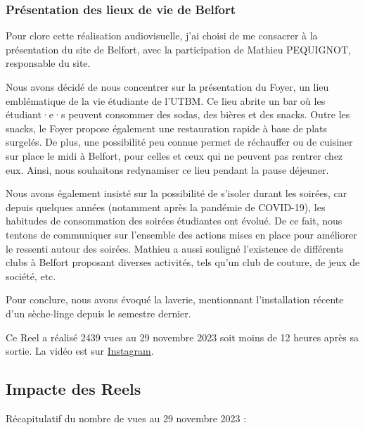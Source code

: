 \subsubsection{Présentation des lieux de vie de Belfort}

Pour clore cette réalisation audiovisuelle, j'ai choisi de me consacrer à la présentation du site de Belfort, avec la participation de Mathieu PEQUIGNOT, responsable du site.

Nous avons décidé de nous concentrer sur la présentation du Foyer, un lieu emblématique de la vie étudiante de l'\gls{UTBM}.
Ce lieu abrite un bar où les étudiant·e·s peuvent consommer des sodas, des bières et des snacks.
Outre les snacks, le Foyer propose également une restauration rapide à base de plats surgelés.
De plus, une possibilité peu connue permet de réchauffer ou de cuisiner sur place le midi à Belfort, pour celles et ceux qui ne peuvent pas rentrer chez eux.
Ainsi, nous souhaitons redynamiser ce lieu pendant la pause déjeuner.

Nous avons également insisté sur la possibilité de s'isoler durant les soirées, car depuis quelques années (notamment après la pandémie de COVID-19), les habitudes de consommation des soirées étudiantes ont évolué.
De ce fait, nous tentons de communiquer sur l'ensemble des actions mises en place pour améliorer le ressenti autour des soirées.
Mathieu a aussi souligné l'existence de différents clubs à Belfort proposant diverses activités, tels qu'un club de couture, de jeux de société, etc.

Pour conclure, nous avons évoqué la laverie, mentionnant l'installation récente d'un sèche-linge depuis le semestre dernier.

Ce Reel a réalisé 2439 vues au 29 novembre 2023 soit moins de 12 heures après sa sortie.
La vidéo est sur \href{https://www.instagram.com/reel/C0OWkRusrx2/?utm_source=ig_web_copy_link&igshid=MzRlODBiNWFlZA==}{Instagram}.


\subsection{Impacte des Reels}\label{subsec:impacte-des-reels}


Récapitulatif du nombre de vues au 29 novembre 2023 :

